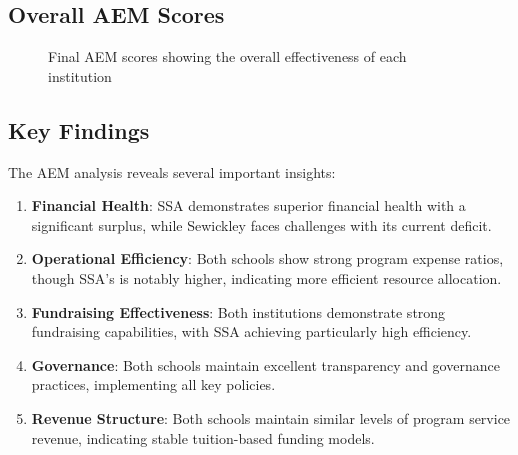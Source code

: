 \documentclass[12pt]{article}
\begin{document}
\subsection{Overall AEM Scores}

\begin{figure}[H]
\centering
{}
\caption{Final AEM scores showing the overall effectiveness of each institution}
\label{fig:final_scores}
\end{figure}

\subsection{Key Findings}

The AEM analysis reveals several important insights:

\begin{enumerate}
    \item \textbf{Financial Health}: SSA demonstrates superior financial health with a significant surplus, while Sewickley faces challenges with its current deficit.
    
    \item \textbf{Operational Efficiency}: Both schools show strong program expense ratios, though SSA's is notably higher, indicating more efficient resource allocation.
    
    \item \textbf{Fundraising Effectiveness}: Both institutions demonstrate strong fundraising capabilities, with SSA achieving particularly high efficiency.
    
    \item \textbf{Governance}: Both schools maintain excellent transparency and governance practices, implementing all key policies.
    
    \item \textbf{Revenue Structure}: Both schools maintain similar levels of program service revenue, indicating stable tuition-based funding models.
\end{enumerate}
\end{document}
